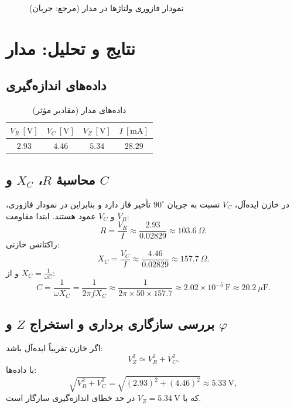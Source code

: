 \documentclass[a4paper,11pt]{article}
\begin{document}
\begin{figure}[h!]
\caption{نمودار فازوری ولتاژها در مدار  (مرجع: جریان)}
\label{fig:phasorRL}
\centering
\def\sc{0.8}
\end{figure}

\section{نتایج و تحلیل: مدار }
\subsection{داده‌های اندازه‌گیری}
\begin{table}[h!]
\centering
\caption{داده‌های مدار  (مقادیر مؤثر)}
\label{tab:RC}
\begin{tabular}{cccc}
\toprule
$V_R~[\mathrm{V}]$ & $V_C~[\mathrm{V}]$ & $V_Z~[\mathrm{V}]$ & $I~[\mathrm{mA}]$ \\
\midrule
$2.93$ & $4.46$ & $5.34$ & $28.29$ \\
\bottomrule
\end{tabular}
\end{table}

\subsection{محاسبهٔ $R$، $X_C$ و $C$}
در خازن ایده‌آل، $V_C$ نسبت به جریان $90^\circ$ تأخیر فاز دارد و بنابراین در نمودار فازوری، $V_R$ و $V_C$ عمود هستند. ابتدا مقاومت:
\[
R=\frac{V_R}{I}\approx \frac{2.93}{0.02829}\approx 103.6~\Omega.
\]
راکتانس خازنی:
\[
X_C=\frac{V_C}{I}\approx \frac{4.46}{0.02829}\approx 157.7~\Omega.
\]
و از $X_C=\frac{1}{\omega C}$:
\[
C=\frac{1}{\omega X_C}=\frac{1}{2\pi f X_C}\approx
\frac{1}{2\pi\times 50\times 157.7}\approx 2.02\times 10^{-5}~\mathrm{F}\approx 20.2~\mu\mathrm{F}.
\]

\subsection{بررسی سازگاری برداری و استخراج $Z$ و $\varphi$}
اگر خازن تقریباً ایده‌آل باشد:
\[
V_Z^2 \simeq V_R^2+V_C^2.
\]
با داده‌ها:
\[
\sqrt{V_R^2+V_C^2}=\sqrt{(2.93)^2+(4.46)^2}\approx 5.33~\mathrm{V},
\]
که با $V_Z=5.34~\mathrm{V}$ در حد خطای اندازه‌گیری سازگار است.
\end{document}
